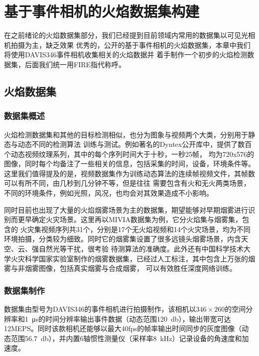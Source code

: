 
\chapter{基于事件相机的火焰数据集构建}
在之前绪论的火焰数据集部分，我们已经提到目前领域内常用的数据集以可见光相机拍摄为主，缺乏效果
优秀的，公开的基于事件相机的火焰数据集，本章中我们将使用DAVIS346事件相机收集相关的火焰数据并
着手制作一个初步的火焰检测数据集，后面我们统一用FIRE指代称呼。

\section{火焰数据集}
\subsection{数据集概述}
火焰检测数据集和其他的目标检测相似，也分为图象与视频两个大类，分别用于静态与动态不同的检测算法
训练与测试。例如著名的Dyntex公开库\cite{peteri2008comprehensive}中，提供了数百个动态视频纹理系列，其中的每个序列时间大于十秒，一秒25帧，
均为720x576的图像，同时每个均备注了一些相关的信息，包括采集的时间，设备，环境条件等。这里我们值得提及的是，视频数据集作为训练动态算法的连续帧视频文件，其帧数可以有所不同，由几秒到几分钟不等，但是往往
需要包含有火和无火两类场景，不同的环境条件，例如光照，风况，也均会对其效果造成不小影响。

同时目前也出现了大量的火焰烟雾场景为主的数据集，期望能够对早期烟雾进行识别而更早确定火灾场景。这里再以MIVIA数据集\cite{foggia2015real}为例，它分火焰集与烟雾集，包含的
火灾集视频序列共31个，分别是17个无火焰视频和14个火灾场景，均为不同环境拍摄，分类较为细致。同时它的烟雾集设置了很多远镜头烟雾场景，内含天空、云、强自然光等干扰，很考验
待测算法的准确度。此外还有中国科学技术大学火灾科学国家实验室制作的烟雾数据集，已经过人工标注，其中包含上万张的烟雾与非烟雾图像，包括真实烟雾与合成烟雾，
可以有效胜任深度网络训练。

\subsection{数据集制作}
数据集由型号为DAVIS346的事件相机进行拍摄制作，该相机以$346\times260$的空间分辨率和\SI{1}{\micro\second}的时间分辨率输出事件数据（动态范围\SI{120}{\decibel}），输出带宽可达12MEPS。同时该款相机还能够以最大40fps的帧率输出时间同步的灰度图像（动态范围\SI{56.7}{\decibel}），并内置6轴惯性测量仪（采样率\SI{8}{\kilo\hertz}）记录设备的角速度和加速度。

